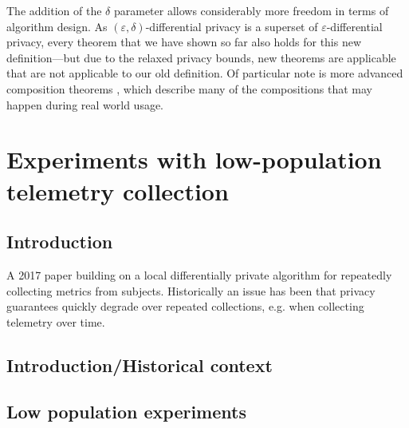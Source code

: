 \documentclass[12pt]{article}
\renewcommand{\epsilon}{\varepsilon}
\begin{document}
The addition of the $\delta$ parameter allows considerably more freedom in terms of algorithm design. As $(\epsilon,\delta)$-differential privacy is a superset of $\epsilon$-differential privacy, every theorem that we have shown so far also holds for this new definition---but due to the relaxed privacy bounds, new theorems are applicable that are not applicable to our old definition. Of particular note is more advanced composition theorems \cite[Sec.~3.5.2]{dwork_privacybook}, which describe many of the compositions that may happen during real world usage.

\section{Experiments with low-population telemetry collection \label{sec:telemetry}}

\subsection{Introduction}

A 2017 paper building on a local differentially private algorithm for repeatedly collecting metrics from subjects. Historically an issue has been that privacy guarantees quickly degrade over repeated collections, e.g. when collecting telemetry over time.

\subsection{Introduction/Historical context}

\subsection{Low population experiments}
\end{document}
